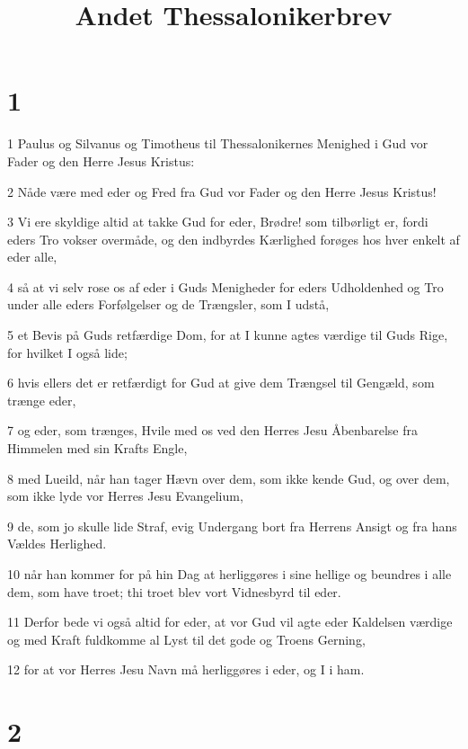 

\title{Andet Thessalonikerbrev}


\chapter{1}

\par 1 Paulus og Silvanus og Timotheus til Thessalonikernes Menighed i Gud vor Fader og den Herre Jesus Kristus:
\par 2 Nåde være med eder og Fred fra Gud vor Fader og den Herre Jesus Kristus!
\par 3 Vi ere skyldige altid at takke Gud for eder, Brødre! som tilbørligt er, fordi eders Tro vokser overmåde, og den indbyrdes Kærlighed forøges hos hver enkelt af eder alle,
\par 4 så at vi selv rose os af eder i Guds Menigheder for eders Udholdenhed og Tro under alle eders Forfølgelser og de Trængsler, som I udstå,
\par 5 et Bevis på Guds retfærdige Dom, for at I kunne agtes værdige til Guds Rige, for hvilket I også lide;
\par 6 hvis ellers det er retfærdigt for Gud at give dem Trængsel til Gengæld, som trænge eder,
\par 7 og eder, som trænges, Hvile med os ved den Herres Jesu Åbenbarelse fra Himmelen med sin Krafts Engle,
\par 8 med Lueild, når han tager Hævn over dem, som ikke kende Gud, og over dem, som ikke lyde vor Herres Jesu Evangelium,
\par 9 de, som jo skulle lide Straf, evig Undergang bort fra Herrens Ansigt og fra hans Vældes Herlighed.
\par 10 når han kommer for på hin Dag at herliggøres i sine hellige og beundres i alle dem, som have troet; thi troet blev vort Vidnesbyrd til eder.
\par 11 Derfor bede vi også altid for eder, at vor Gud vil agte eder Kaldelsen værdige og med Kraft fuldkomme al Lyst til det gode og Troens Gerning,
\par 12 for at vor Herres Jesu Navn må herliggøres i eder, og I i ham.

\chapter{2}

